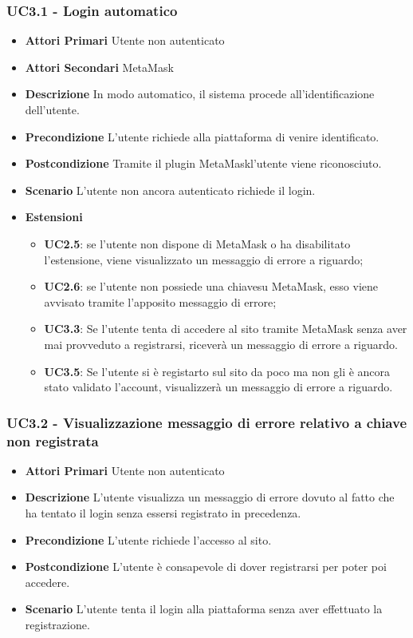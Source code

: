 \subsubsection{UC3.1 - Login automatico}
\begin{itemize}
	\item \textbf{Attori Primari}
	Utente non autenticato
	\item \textbf{Attori Secondari}
	MetaMask\glo
	\item \textbf{Descrizione}
	In modo automatico, il sistema procede all'identificazione dell'utente.
	\item \textbf{Precondizione}
	L'utente richiede alla piattaforma di venire identificato.
	\item \textbf{Postcondizione}
	Tramite il plugin MetaMask\glo l'utente viene riconosciuto.
	\item \textbf{Scenario}
	L'utente non ancora autenticato richiede il login.
	\item \textbf{Estensioni}
	\begin{itemize}
		\item \textbf{UC2.5}: se l'utente non dispone di MetaMask o ha disabilitato l'estensione, viene visualizzato un messaggio di errore a riguardo;
		\item \textbf{UC2.6}: se l'utente non possiede una chiave\glosp su MetaMask\glo, esso viene avvisato tramite l'apposito messaggio di errore;
		\item \textbf{UC3.3}: Se l'utente tenta di accedere al sito tramite MetaMask senza aver mai provveduto a registrarsi, riceverà un messaggio di errore a riguardo.
		
		\item \textbf{UC3.5}: Se l'utente si è registarto sul sito da poco ma non gli è ancora stato validato l'account, visualizzerà un messaggio di errore a riguardo.
	\end{itemize}
\end{itemize}
\subsubsection{UC3.2 - Visualizzazione messaggio di errore relativo a chiave non registrata}
\begin{itemize}
	\item \textbf{Attori Primari}
	Utente non autenticato
	\item \textbf{Descrizione}
	L'utente visualizza un messaggio di errore dovuto al fatto che ha tentato il login senza essersi registrato in precedenza.
	\item \textbf{Precondizione}
	L'utente richiede l'accesso al sito.
	\item \textbf{Postcondizione}
	L'utente è consapevole di dover registrarsi per poter poi accedere.
	\item \textbf{Scenario}
	L'utente tenta il login alla piattaforma senza aver effettuato la registrazione.
\end{itemize}
